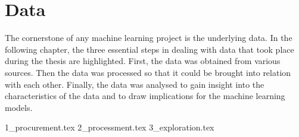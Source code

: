\clearpage \section{Data}

The cornerstone of any machine learning project is the underlying data. In the following chapter, the three essential steps in dealing with data that took place during the thesis are highlighted. First, the data was obtained from various sources. Then the data was processed so that it could be brought into relation with each other. Finally, the data was analysed to gain insight into the characteristics of the data and to draw implications for the machine learning models.

{1_procurement.tex}
{2_processment.tex}
{3_exploration.tex}
